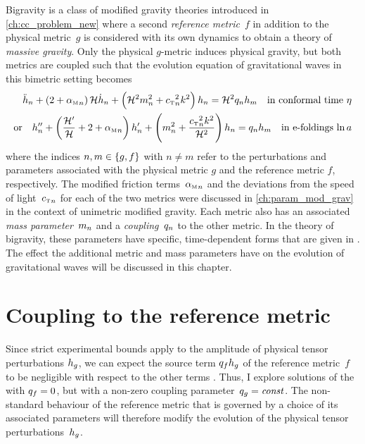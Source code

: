 Bigravity is a class of modified gravity theories introduced in \autoref{ch:cc_problem_new} where a second \emph{reference metric}~\(f\) in addition to the physical metric~\(g\) is considered with its own dynamics to obtain a theory of \emph{massive gravity}. Only the physical \(g\)-metric induces physical gravity, but both metrics are coupled such that the evolution equation of gravitational waves in this bimetric setting becomes \autocite{Amendola2015}
\begin{subequations}\label{eq:evolution_bimetric}
\begin{align}
	\ddconf{h}\ofmetr{n} + \del{2 + \alphaMofmetr{n}} \Hconf \dconf{h}\ofmetr{n} + \del{\Hconf^2 \mofmetr{n}^2 + \cTofmetr{n}^2 k^2} h\ofmetr{n} = \Hconf^2 \qofmetr{n} h\ofmetr{m} \quad \text{in conformal time \(\conft\)} \\
    \text{or} \quad \ddefold{h}\ofmetr{n} + \del{\frac{\defold{\Hconf}}{\Hconf} + 2 + \alphaMofmetr{n}} \defold{h}\ofmetr{n} + \del{\mofmetr{n}^2 + \frac{\cTofmetr{n}^2 k^2}{\Hconf^2}} h\ofmetr{n} = \qofmetr{n} h\ofmetr{m} \quad \text{in e-foldings \(\efold\)}
\end{align}
\end{subequations}
where the indices \(n,m \in \cbr{g,f}\) with \(n \neq m\) refer to the perturbations and parameters associated with the physical metric \(g\) and the reference metric \(f\), respectively. The modified friction terms~\({\alpha_{\textnormal{\tiny{M}}}}_{n}\) and the deviations from the speed of light~\({c_{\textnormal{\tiny{T}}}}_{n}\) for each of the two metrics were discussed in \autoref{ch:param_mod_grav} in the context of unimetric modified gravity. Each metric also has an associated \emph{mass parameter}~\(m_{n}\) and a \emph{coupling}~\(q_{n}\) to the other metric. In the theory of bigravity, these parameters have specific, time-dependent forms that are given in \cite{Amendola2015}. The effect the additional metric and mass parameters have on the evolution of gravitational waves will be discussed in this chapter.

\section{Coupling to the reference metric}\label{sec:bimetric_coupling}

Since strict experimental bounds apply to the amplitude of physical tensor perturbations \(h_{g}\), we can expect the source term \(q_{f}h_{g}\) of the reference metric~\(f\) to be negligible with respect to the other terms \autocite{Amendola2015}. Thus, I explore solutions of the  with \(q_{f}=0\), but with a non-zero coupling parameter~\(q_{g}=\textnormal{\textit{const}}\). The non-standard behaviour of the reference metric that is governed by a choice of its associated parameters will therefore modify the evolution of the physical tensor perturbations~\(h_{g}\). 

